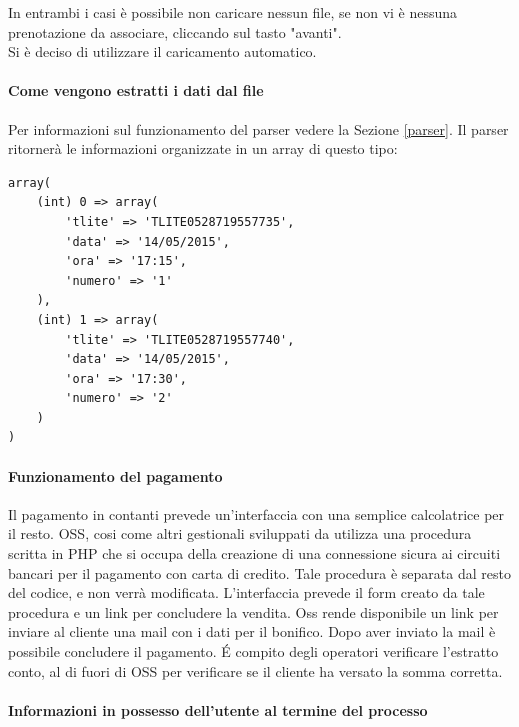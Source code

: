 In entrambi i casi è possibile non caricare nessun file, se non vi è nessuna prenotazione da associare, cliccando sul tasto "avanti". \\

Si è deciso di utilizzare il caricamento automatico.

\paragraph{Come vengono estratti i dati dal file} 
Per informazioni sul funzionamento del parser vedere la Sezione \ref{parser}.
Il parser ritornerà le informazioni organizzate in un array di questo tipo:
\begin{lstlisting}
array(
	(int) 0 => array(
		'tlite' => 'TLITE0528719557735',
		'data' => '14/05/2015',
		'ora' => '17:15',
		'numero' => '1'
	),
	(int) 1 => array(
		'tlite' => 'TLITE0528719557740',
		'data' => '14/05/2015',
		'ora' => '17:30',
		'numero' => '2'
	)
)
\end{lstlisting}

\paragraph{Funzionamento del pagamento} 
 Il pagamento in contanti prevede un'interfaccia con una semplice calcolatrice per il resto.
 OSS, cosi come altri gestionali sviluppati da \net utilizza una procedura scritta in PHP che si occupa della creazione di una connessione sicura ai circuiti bancari per il pagamento con carta di credito. Tale procedura è separata dal resto del codice, e non verrà modificata. L'interfaccia prevede il form creato da tale procedura e un link per concludere la vendita.
 Oss rende disponibile un link per inviare al cliente una mail con i dati per il bonifico. Dopo aver inviato la mail è possibile concludere il pagamento. \'E compito degli operatori verificare l'estratto conto, al di fuori di OSS per verificare se il cliente ha versato la somma corretta.

\paragraph{Informazioni in possesso dell'utente al termine del processo} 

